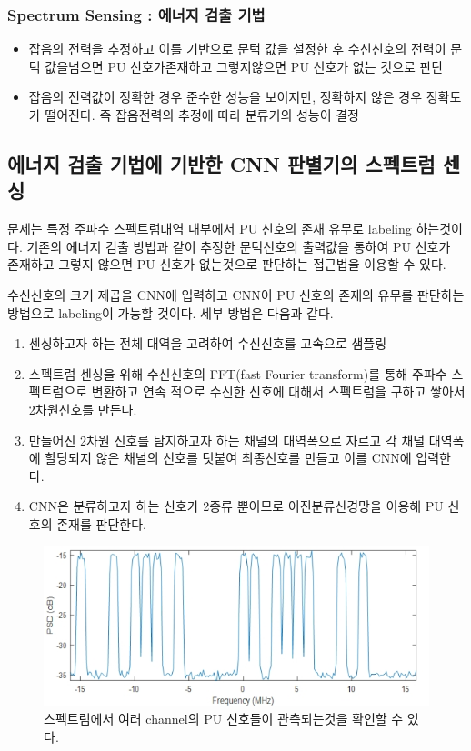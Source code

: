    \subsubsection*{Spectrum Sensing : 에너지 검출 기법}
    \begin{itemize}
        \item 잡음의 전력을 추정하고 이를 기반으로 문턱 값을 설정한 후 수신신호의 전력이 문턱 값을넘으면 PU 신호가존재하고 그렇지않으면 PU 신호가 없는 것으로 판단
        \item 잡음의 전력값이 정확한 경우 준수한 성능을 보이지만, 정확하지 않은 경우 정확도가 떨어진다. 즉 잡음전력의 추정에 따라 분류기의 성능이 결정
    \end{itemize}
\clearpage
\subsection{에너지 검출 기법에 기반한 CNN 판별기의 스펙트럼 센싱}
    문제는 특정 주파수 스펙트럼대역 내부에서 PU 신호의 존재 유무로 labeling 하는것이다. 기존의 에너지 검출 방법과 같이 추정한 문턱신호의 출력값을 통하여 PU 신호가 존재하고 그렇지 않으면 PU 신호가 없는것으로 판단하는 접근법을 이용할 수 있다.
    
    수신신호의 크기 제곱을 CNN에 입력하고 CNN이 PU 신호의 존재의 유무를 판단하는 방법으로 labeling이 가능할 것이다. 세부 방법은 다음과 같다.
    \begin{enumerate}
        \item 센싱하고자 하는 전체 대역을 고려하여 수신신호를 고속으로 샘플링
        \item 스펙트럼 센싱을 위해 수신신호의 FFT(fast Fourier transform)를 통해 주파수 스펙트럼으로 변환하고 연속 적으로 수신한 신호에 대해서 스펙트럼을 구하고 쌓아서 2차원신호를 만든다.
        \item 만들어진 2차원 신호를 탐지하고자 하는 채널의 대역폭으로 자르고 각 채널 대역폭에 할당되지 않은 채널의 신호를 덧붙여 최종신호를 만들고 이를 CNN에 입력한다. 
        \item CNN은 분류하고자 하는 신호가 2종류 뿐이므로 이진분류신경망을 이용해 PU 신호의 존재를 판단한다. 
    \end{enumerate}
    \begin{figure}[!h]\centering
		\includegraphics[width=.6\textwidth]{image/week04/4-1.png}
		\caption{ 스펙트럼에서 여러 channel의 PU 신호들이 관측되는것을 확인할 수 있다. }
		\vspace{-10pt}
    \end{figure}
    
